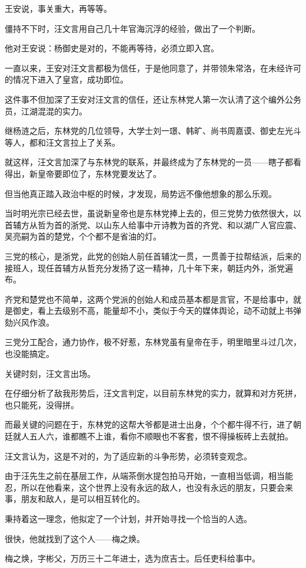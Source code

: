 \begin{multicols}{\theparacolNo}
		王安说，事关重大，再等等。

		僵持不下时，汪文言用自己几十年官海沉浮的经验，做出了一个判断。

		他对王安说：杨御史是对的，不能再等待，必须立即入宫。

		一直以来，王安对汪文言都极为信任，于是他同意了，并带领朱常洛，在未经许可的情况下进入了皇宫，成功即位。

		这件事不但加深了王安对汪文言的信任，还让东林党人第一次认清了这个编外公务员，江湖混混的实力。

		继杨涟之后，东林党的几位领导，大学士刘一璟、韩旷、尚书周嘉谟、御史左光斗等人，都和汪文言拉上了关系。

		就这样，汪文言加深了与东林党的联系，并最终成为了东林党的一员——瞎子都看得出，新皇帝要即位了，东林党要发达了。

		但当他真正踏入政治中枢的时候，才发现，局势远不像他想象的那么乐观。

		当时明光宗已经去世，虽说新皇帝也是东林党捧上去的，但三党势力依然很大，以首辅方从哲为首的浙党、以山东人给事中亓诗教为首的齐党、和以湖广人官应震、吴亮嗣为首的楚党，个个都不是省油的灯。

		三党的核心，是浙党，此党的创始人前任首辅沈一贯，一贯善于拉帮结派，后来的接班人，现任首辅方从哲充分发扬了这一精神，几十年下来，朝廷内外，浙党遍布。

		齐党和楚党也不简单，这两个党派的创始人和成员基本都是言官，不是给事中，就是御史，看上去级别不高，能量却不小，类似于今天的媒体舆论，动不动就上书弹劾兴风作浪。

		三党分工配合，通力协作，极不好惹，东林党虽有皇帝在手，明里暗里斗过几次，也没能搞定。

		关键时刻，汪文言出场。

		在仔细分析了敌我形势后，汪文言判定，以目前东林党的实力，就算和对方死拼，也只能死，没得拼。

		而最关键的问题在于，东林党的这帮大爷都是进士出身，个个都牛得不行，进了朝廷就人五人六，谁都瞧不上谁，看你不顺眼也不客套，恨不得操板砖上去就拍。

		汪文言认为，这是不对的，为了适应新的斗争形势，必须转变观念。

		由于汪先生之前在基层工作，从端茶倒水提包拍马开始，一直相当低调，相当能忍，所以在他看来，这个世界上没有永远的敌人，也没有永远的朋友，只要会来事，朋友和敌人，是可以相互转化的。

		秉持着这一理念，他拟定了一个计划，并开始寻找一个恰当的人选。

		很快，他就找到了这个人——梅之焕。

		梅之焕，字彬父，万历三十二年进士，选为庶吉士。后任吏科给事中。


\end{multicols}
